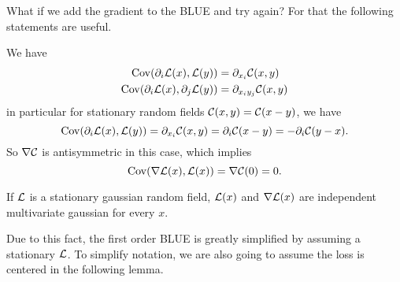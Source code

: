 What if we add the gradient to the BLUE and try again?
For that the following
statements are useful.
\begin{lemma}
	We have
	\begin{align*}
		\operatorname{Cov}(\partial_i\mathcal{L}(x), \mathcal{L}(y)) &= \partial_{x_i} \mathcal{C}(x,y)\\
		\operatorname{Cov}(\partial_i\mathcal{L}(x), \partial_j \mathcal{L}(y)) &= \partial_{x_i y_j} \mathcal{C}(x,y)
	\end{align*}
	in particular for stationary random fields \(\mathcal{C}(x,y)=\mathcal{C}(x-y)\), we have 
	\begin{equation*}
		\operatorname{Cov}(\partial_i\mathcal{L}(x), \mathcal{L}(y))
		= \partial_{x_i} \mathcal{C}(x,y) = \partial_i \mathcal{C}(x-y) = - \partial_i \mathcal{C}(y-x).
	\end{equation*}
	So \(\nabla \mathcal{C}\) is antisymmetric in this case, which implies 
	\begin{equation*}
		\operatorname{Cov}(\nabla\mathcal{L}(x), \mathcal{L}(x)) = \nabla \mathcal{C}(0)=0.
	\end{equation*}
\end{lemma}

\begin{corollary}
	If \(\mathcal{L}\) is a stationary gaussian random field, \(\mathcal{L}(x)\) and
	\(\nabla\mathcal{L}(x)\) are independent multivariate gaussian for every \(x\).
\end{corollary}

Due to this fact, the first order BLUE is greatly simplified by assuming a
stationary \(\mathcal{L}\). To simplify notation, we are also going to assume
the loss is centered in the following lemma.

